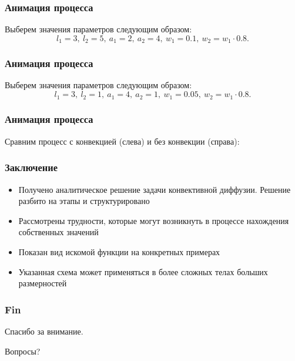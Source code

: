 \documentclass[10pt,pdf,hyperref={unicode}]{beamer}
\begin{document}
\begin{frame}
 \frametitle{Анимация процесса}
 Выберем значения параметров следующим образом:
  \begin{equation*}
    l_1=3,\ l_2=5,\ a_1=2,\ a_2=4,\ w_1=0.1,\ w_2=w_1 \cdot 0.8.
  \end{equation*}
 \begin{center}
 \end{center}
\end{frame}


\begin{frame}
 \frametitle{Анимация процесса}
 Выберем значения параметров следующим образом:
  \begin{equation*}
    l_1=3,\ l_2=1,\ a_1=4,\ a_2=1,\ w_1=0.05,\ w_2=w_1 \cdot 0.8.
  \end{equation*}
 \begin{center}
 \end{center}
\end{frame}

\begin{frame}
 \frametitle{Анимация процесса}
 Сравним процесс с конвекцией (слева) и без конвекции (справа):
 \begin{center}
 \end{center}
\end{frame}

\begin{frame}
  \frametitle{Заключение}
  \begin{itemize}
    \item Получено аналитическое решение задачи конвективной диффузии. Решение разбито на этапы и структурировано
    \item Рассмотрены трудности, которые могут возникнуть в процессе нахождения собственных значений
    \item Показан вид искомой функции на конкретных примерах
    \item Указанная схема может применяться в более сложных телах больших размерностей
  \end{itemize}
\end{frame}

\begin{frame}
  \frametitle{Fin}
  \begin{center}
    Спасибо за внимание.

    Вопросы?
  \end{center}
\end{frame}
\end{document}
